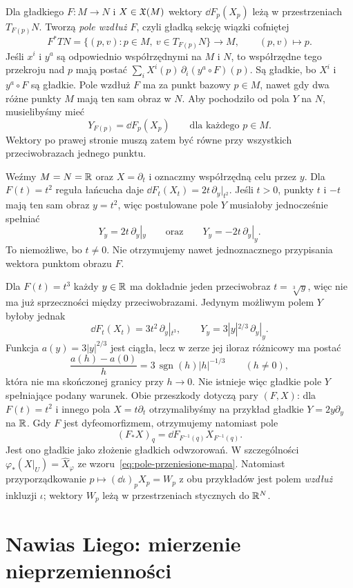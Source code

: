 \begin{uwaga}
Dla gładkiego $F\colon M\to N$ i $X\in\mathfrak X(M)$ wektory
$\dd F_p(X_p)$ leżą w przestrzeniach $T_{F(p)}N$.
Tworzą \emph{pole wzdłuż $F$}, czyli gładką sekcję wiązki cofniętej
\[
 F^*TN=\{(p,v):p\in M,\ v\in T_{F(p)}N\}\longrightarrow M,
 \qquad(p,v)\longmapsto p.
\]
Jeśli $x^i$ i $y^a$ są odpowiednio współrzędnymi na $M$ i $N$,
to współrzędne tego przekroju nad $p$ mają postać
$\sum_i X^i(p)\,\partial_i(y^a\circ F)(p)$.
Są gładkie, bo $X^i$ i $y^a\circ F$ są gładkie.
Pole wzdłuż $F$ ma za punkt bazowy $p\in M$, nawet gdy dwa różne
punkty $M$ mają ten sam obraz w $N$. Aby pochodziło od pola $Y$ na $N$,
musielibyśmy mieć
\[
 Y_{F(p)}=\dd F_p(X_p)\qquad\text{dla każdego }p\in M.
\]
Wektory po prawej stronie muszą zatem być równe przy wszystkich
przeciwobrazach jednego punktu.

Weźmy $M=N=\mathbb{R}$ oraz $X=\partial_t$ i oznaczmy współrzędną celu przez $y$.
Dla $F(t)=t^2$ reguła łańcucha daje
$\dd F_t(X_t)=2t\,\partial_y|_{t^2}$.
Jeśli $t>0$, punkty $t$ i $-t$ mają ten sam obraz $y=t^2$, więc
postulowane pole $Y$ musiałoby jednocześnie spełniać
\[
 Y_y=2t\,\partial_y|_y
 \qquad\text{oraz}\qquad
 Y_y=-2t\,\partial_y|_y.
\]
To niemożliwe, bo $t\ne0$. Nie otrzymujemy nawet jednoznacznego
przypisania wektora punktom obrazu $F$.

Dla $F(t)=t^3$ każdy $y\in\mathbb{R}$ ma dokładnie jeden przeciwobraz
$t=\sqrt[3]{y}$, więc nie ma już sprzeczności między przeciwobrazami.
Jedynym możliwym polem $Y$ byłoby jednak
\[
 \dd F_t(X_t)=3t^2\,\partial_y|_{t^3},
 \qquad
 Y_y=3|y|^{2/3}\,\partial_y|_y.
\]
Funkcja $a(y)=3|y|^{2/3}$ jest ciągła, lecz w zerze jej iloraz
różnicowy ma postać
\[
 \frac{a(h)-a(0)}{h}
 =3\,\operatorname{sgn}(h)|h|^{-1/3}\qquad(h\ne0),
\]
która nie ma skończonej granicy przy $h\to0$.
Nie istnieje więc gładkie pole $Y$ spełniające podany warunek.
Obie przeszkody dotyczą pary $(F,X)$: dla $F(t)=t^2$ i innego pola
$X=t\partial_t$ otrzymalibyśmy na przykład gładkie
$Y=2y\partial_y$ na $\mathbb{R}$.
Gdy $F$ jest dyfeomorfizmem, otrzymujemy natomiast pole
\[
 (F_*X)_q=\dd F_{F^{-1}(q)}X_{F^{-1}(q)}.
\]
Jest ono gładkie jako złożenie gładkich odwzorowań.
W szczególności $\varphi_*(X|_U)=\widehat X_\varphi$
ze wzoru~\eqref{eq:pole-przeniesione-mapa}.
Natomiast przyporządkowanie
$p\longmapsto(\dd\iota)_pX_p=W_p$ z obu przykładów
jest polem \emph{wzdłuż} inkluzji $\iota$;
wektory $W_p$ leżą w przestrzeniach stycznych do $\mathbb{R}^N$.
\end{uwaga}

\section{Nawias Liego: mierzenie nieprzemienności}
\label{sec:nawias}

